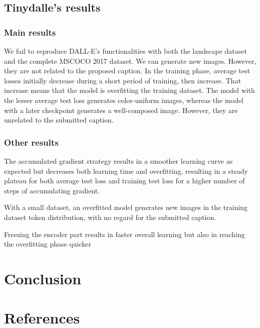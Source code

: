 \documentclass{article}
\begin{document}
\subsection{Tinydalle's results}\label{subsec:tinydalle_results}

\subsubsection{Main results}

We fail to reproduce DALL-E's functionalities with both the landscape dataset and the complete MSCOCO 2017 dataset. We can generate new images. However, they are not related to the proposed caption. In the training phase, average test losses initially decrease during a short period of training, then increase. That increase means that the model is overfitting the training dataset. The model with the lesser average test loss generates color-uniform images, whereas the model with a later checkpoint generates a well-composed image. However, they are unrelated to the submitted caption.

\subsubsection{Other results}

The accumulated gradient strategy results in a smoother learning curve as expected but decreases both learning time and overfitting, resulting in a steady plateau for both average test loss and training test loss for a higher number of steps of accumulating gradient.

With a small dataset, an overfitted model generates new images in the training dataset token distribution, with no regard for the submitted caption.

Freezing the encoder part results in faster overall learning but also in reaching the overfitting phase quicker

\pagebreak

\section{Conclusion}

\pagebreak
{}
{}
\section*{References}


\printbibliography[
    heading = subbibintoc,
    type=article,
    title={Articles scientifiques}]
    
\end{document}

